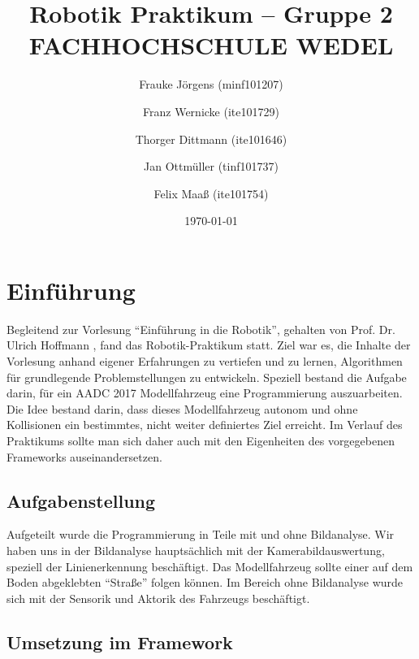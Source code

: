 \documentclass[a4paper,12pt]{report}
\begin{document}

	\title{Robotik Praktikum -- Gruppe 2\\FACHHOCHSCHULE WEDEL}
	\author{Frauke Jörgens (minf101207) \and Franz Wernicke (ite101729) \and Thorger Dittmann (ite101646) \and Jan Ottmüller (tinf101737) \and Felix Maaß (ite101754)}
	\date{\today}
	\maketitle

	\tableofcontents


\chapter{Einführung}

	Begleitend zur Vorlesung ``Einführung in die Robotik'', gehalten von Prof. Dr. Ulrich Hoffmann \cite{hoffmann_ws17}, fand das Robotik-Praktikum statt.
	Ziel war es, die Inhalte der Vorlesung anhand eigener Erfahrungen zu vertiefen und zu lernen, Algorithmen für grundlegende Problemstellungen zu entwickeln.
	Speziell bestand die Aufgabe darin, für ein AADC 2017 Modellfahrzeug eine Programmierung auszuarbeiten.
	Die Idee bestand darin, dass dieses Modellfahrzeug autonom und ohne Kollisionen ein bestimmtes, nicht weiter definiertes Ziel erreicht.
	Im Verlauf des Praktikums sollte man sich daher auch mit den Eigenheiten des vorgegebenen Frameworks auseinandersetzen.

\section{Aufgabenstellung}

	Aufgeteilt wurde die Programmierung in Teile mit und ohne Bildanalyse.
	Wir haben uns in der Bildanalyse hauptsächlich mit der Kamerabildauswertung, speziell der Linienerkennung beschäftigt.
	Das Modellfahrzeug sollte einer auf dem Boden abgeklebten ``Straße'' folgen können.
	Im Bereich ohne Bildanalyse wurde sich mit der Sensorik und Aktorik des Fahrzeugs beschäftigt.

\section{Umsetzung im Framework}
\end{document}
